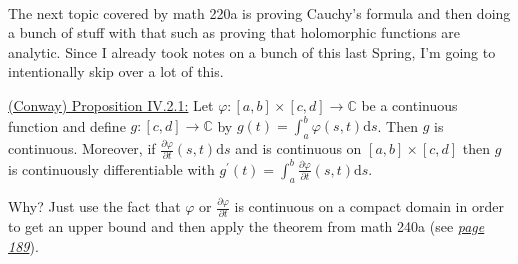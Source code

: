 \documentclass{book}
\newcommand{\inLinkRap}[2]{{\color{blue}\hyperlink{#1}{\textit{#2}}}}
\newcommand{\hTwo}{%
\color{Black}%
   \fontsize{13}{15}\selectfont%
}
\newcommand{\exTwo}{%
   \color{Purple}%
   \fontsize{13}{15}\selectfont%
}
\newcommand{\exThreeP}{%
   \color{RedViolet}%
   \fontsize{12}{14}\selectfont%
}
\newenvironment{myIndent}{%
   \begin{adjustwidth}{2.5em}{0em}%
}{%
   \end{adjustwidth}%
}
\newcommand{\df}{\mathrm{d}}
\newcommand{\mySepTwo}[1][.]{%
   {\noindent\color{#1}{\rule{6.5in}{0.5mm}}}\\%
}
\newcommand{\retTwo}{\hfill\bigbreak}
\begin{document}
\hTwo\mySepTwo

The next topic covered by math 220a is proving Cauchy's formula and then doing a bunch of stuff with that such as proving that holomorphic functions are analytic.  Since I already took notes on a bunch of this last Spring, I'm going to intentionally skip over a lot of this.\retTwo

\exTwo\ul{(Conway) Proposition IV.2.1:} Let $\varphi : [a, b] \times [c, d] \to \mathbb{C}$ be a continuous function and define $g : [c, d] \to \mathbb{C}$ by $g(t) = \int_a^b \varphi(s, t)\df s$. Then $g$ is continuous. Moreover, if $\frac{\partial \varphi}{\partial t}(s, t)\df s$ and is continuous on $[a, b] \times [c, d]$ then $g$ is continuously differentiable with $g^\prime(t) = \int_a^b \frac{\partial \varphi}{\partial t}(s, t)\df s$.
\begin{myIndent}\exThreeP
	Why? Just use the fact that $\varphi$ or $\frac{\partial \varphi}{\partial t}$ is continuous on a compact domain in order to get an upper bound and then apply the theorem from math 240a (see \inLinkRap{Generalization page 189}{page 189}).\retTwo
\end{myIndent}




\hypertarget{Generalization page 189}{} 


\hypertarget{Folland Proposition 11.2}{}
\hypertarget{Folland Lemma 7.15 reference}{}
\hypertarget{Folland Proposition 11.4(b)}{}

\hypertarget{Alireza lemma page 257}{}

\hypertarget{page 337 reference}{}

\hypertarget{Folland Proposition 10.1}{}


\hypertarget{Folland proposition 11.1}{}

\hypertarget{Ergodic reading group notes 3}{}

\hypertarget{existence and uniqueness diff eq notes}{}
\hypertarget{math 241a lecture 5}{}
\hypertarget{idk reference 2}{}

\hypertarget{idk reference 5}{}
\hypertarget{idk reference 6}{}
\end{document}
